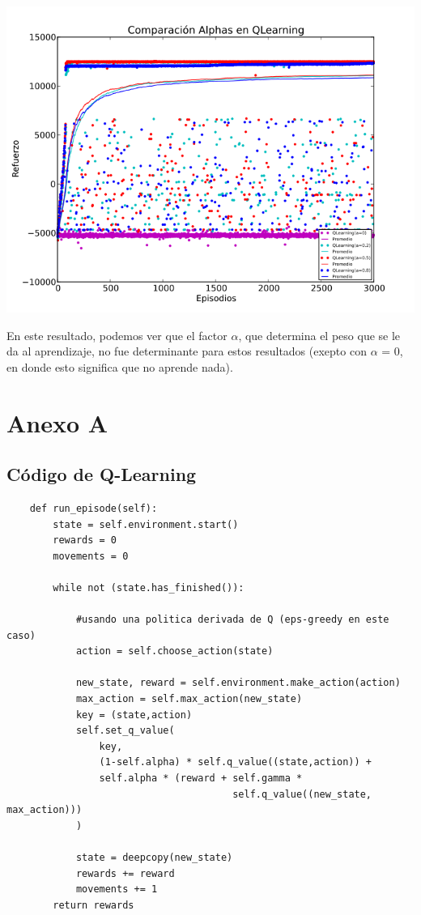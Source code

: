 \documentclass[11pt, a4paper]{article}
\begin{document}
\includegraphics[scale=0.6]{Graf3}

En este resultado, podemos ver que el factor $\alpha$, que determina el peso que se le da al aprendizaje, no fue determinante para estos resultados (exepto con $\alpha$ = 0, en donde esto significa que no aprende nada).


\section{Anexo A}
\subsection{Código de Q-Learning}
\begin{verbatim}
    def run_episode(self):
        state = self.environment.start()
        rewards = 0
        movements = 0
        
        while not (state.has_finished()):
            
            #usando una politica derivada de Q (eps-greedy en este caso)
            action = self.choose_action(state)
            
            new_state, reward = self.environment.make_action(action)
            max_action = self.max_action(new_state)
            key = (state,action)
            self.set_q_value(
                key, 
                (1-self.alpha) * self.q_value((state,action)) + 
                self.alpha * (reward + self.gamma * 
                                       self.q_value((new_state, max_action)))
            )
            
            state = deepcopy(new_state)
            rewards += reward
            movements += 1
        return rewards
\end{verbatim}
\end{document}

